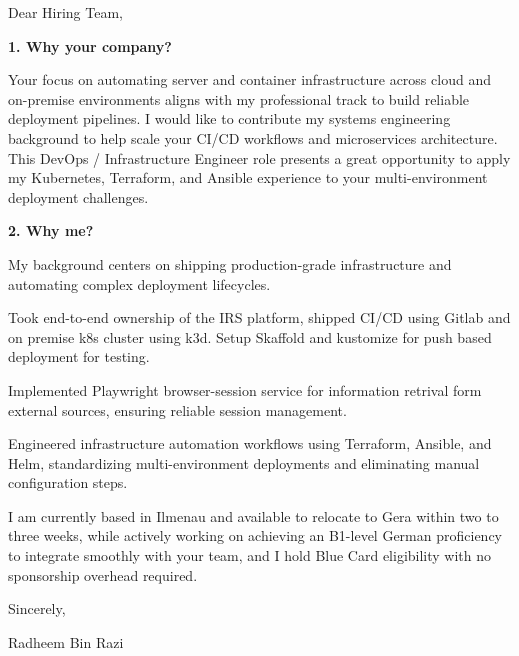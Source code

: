 \documentclass[11pt,a4paper]{coverletter}
\begin{document}

\opening{Dear Hiring Team,}

\vspace{8pt}\noindent\textbf{1. Why your company?}\par\vspace{3pt}

Your focus on automating server and container infrastructure across cloud and on-premise environments aligns with my professional track to build reliable deployment pipelines. I would like to contribute my systems engineering background to help scale your CI/CD workflows and microservices architecture. This DevOps / Infrastructure Engineer role presents a great opportunity to apply my Kubernetes, Terraform, and Ansible experience to your multi-environment deployment challenges.

\vspace{8pt}\noindent\textbf{2. Why me?}\par\vspace{3pt}

My background centers on shipping production-grade infrastructure and automating complex deployment lifecycles.

\bullets

  \item Took end-to-end ownership of the IRS platform, shipped CI/CD using Gitlab and on premise k8s cluster using k3d. Setup Skaffold and kustomize for push based deployment for testing.

  \item Implemented Playwright browser-session service for information retrival form external sources, ensuring reliable session management.

  \item Engineered infrastructure automation workflows using Terraform, Ansible, and Helm, standardizing multi-environment deployments and eliminating manual configuration steps.

\bulletsend

I am currently based in Ilmenau and available to relocate to Gera within two to three weeks, while actively working on achieving an B1-level German proficiency to integrate smoothly with your team, and I hold Blue Card eligibility with no sponsorship overhead required.

\closing{Sincerely,}{Radheem Bin Razi}

\clearpage
{}
\end{document}

